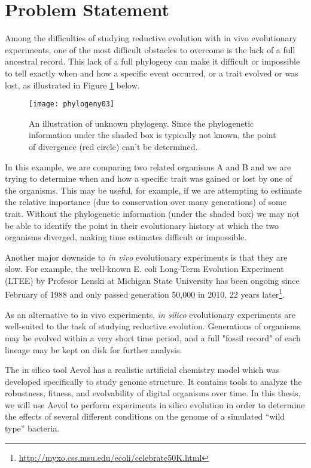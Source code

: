 \section{Problem Statement} \label{problem_statement}
Among the difficulties of studying reductive evolution with in vivo evolutionary experiments, one of the most difficult obstacles to overcome is the lack of a full ancestral record. This lack of a full phylogeny can make it difficult or impossible to tell exactly when and how a specific event occurred, or a trait evolved or was lost, as illustrated in Figure \ref{fig:phylogeny03} below. 
\begin{figure}[h]
\texttt{[image: phylogeny03]}
\centering
\caption[Unknown phylogeny]{An illustration of unknown phylogeny. Since the phylogenetic information under the shaded box is typically not known, the point of divergence (red circle) can't be determined.}
\label{fig:phylogeny03}
\end{figure}
In this example, we are comparing two related organisms A and B and we are trying to determine when and how a specific trait was gained or lost by one of the organisms. This may be useful, for example, if we are attempting to estimate the relative importance (due to conservation over many generations) of some trait. Without the phylogenetic information (under the shaded box) we may not be able to identify the point in their evolutionary history at which the two organisms diverged, making time estimates difficult or impossible.

Another major downside to \textit{in vivo} evolutionary experiments is that they are slow. For example, the well-known E. coli Long-Term Evolution Experiment (LTEE) by Profesor Lenski at Michigan State University has been ongoing since February of 1988 and only passed generation 50,000 in 2010, 22 years later\footnote{\url{http://myxo.css.msu.edu/ecoli/celebrate50K.html}}. 

As an alternative to in vivo experiments, \textit{in silico} evolutionary experiments are well-suited to the task of studying reductive evolution. Generations of organisms may be evolved within a very short time period, and a full "fossil record" of each lineage may be kept on disk for further analysis. 

The in silico tool Aevol has a realistic artificial chemistry model which was developed specifically to study genome structure. It contains tools to analyze the robustness, fitness, and evolvability of digital organisms over time.  In this thesis, we will use Aevol to perform experiments in silico evolution in order to determine the effects of several different conditions on the genome of a simulated ``wild type'' bacteria.

